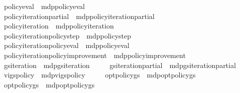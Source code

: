 \begin{isabellebody}
\ \ \ \ \ policy{\isacharunderscore}{\kern0pt}eval{\isacharprime}{\kern0pt}\ {\isacharequal}{\kern0pt}\ mdp{\isachardot}{\kern0pt}policy{\isacharunderscore}{\kern0pt}eval{\isacharprime}{\kern0pt}\isanewline
\ \ \ \ \ policy{\isacharunderscore}{\kern0pt}iteration{\isacharunderscore}{\kern0pt}partial{\isacharprime}{\kern0pt}\ {\isacharequal}{\kern0pt}\ mdp{\isachardot}{\kern0pt}policy{\isacharunderscore}{\kern0pt}iteration{\isacharunderscore}{\kern0pt}partial{\isacharprime}{\kern0pt}\isanewline
\ \ \ \ \ policy{\isacharunderscore}{\kern0pt}iteration{\isacharprime}{\kern0pt}\ {\isacharequal}{\kern0pt}\ mdp{\isachardot}{\kern0pt}policy{\isacharunderscore}{\kern0pt}iteration{\isacharprime}{\kern0pt}\isanewline
\ \ \ \ \ policy{\isacharunderscore}{\kern0pt}iteration{\isacharunderscore}{\kern0pt}policy{\isacharunderscore}{\kern0pt}step{\isacharprime}{\kern0pt}\ {\isacharequal}{\kern0pt}\ mdp{\isachardot}{\kern0pt}policy{\isacharunderscore}{\kern0pt}step{\isacharprime}{\kern0pt}\isanewline
\ \ \ \ \ policy{\isacharunderscore}{\kern0pt}iteration{\isacharunderscore}{\kern0pt}policy{\isacharunderscore}{\kern0pt}eval{\isacharprime}{\kern0pt}\ {\isacharequal}{\kern0pt}\ mdp{\isachardot}{\kern0pt}policy{\isacharunderscore}{\kern0pt}eval{\isacharprime}{\kern0pt}\isanewline
\ \ \ \ \ policy{\isacharunderscore}{\kern0pt}iteration{\isacharunderscore}{\kern0pt}policy{\isacharunderscore}{\kern0pt}improvement{\isacharprime}{\kern0pt}\ {\isacharequal}{\kern0pt}\ mdp{\isachardot}{\kern0pt}policy{\isacharunderscore}{\kern0pt}improvement{\isacharprime}{\kern0pt}\isanewline
\ \ \ \ \ gs{\isacharunderscore}{\kern0pt}iteration\ {\isacharequal}{\kern0pt}\ mdp{\isachardot}{\kern0pt}gs{\isacharunderscore}{\kern0pt}iteration\isanewline
\ \ \ \ \ gs{\isacharunderscore}{\kern0pt}iteration{\isacharunderscore}{\kern0pt}partial\ {\isacharequal}{\kern0pt}\ mdp{\isachardot}{\kern0pt}gs{\isacharunderscore}{\kern0pt}iteration{\isacharunderscore}{\kern0pt}partial\isanewline
\ \ \ \ \ vi{\isacharunderscore}{\kern0pt}gs{\isacharunderscore}{\kern0pt}policy\ {\isacharequal}{\kern0pt}\ mdp{\isachardot}{\kern0pt}vi{\isacharunderscore}{\kern0pt}gs{\isacharunderscore}{\kern0pt}policy\isanewline
\ \ \ \ \ opt{\isacharunderscore}{\kern0pt}policy{\isacharunderscore}{\kern0pt}gs\ {\isacharequal}{\kern0pt}\ mdp{\isachardot}{\kern0pt}opt{\isacharunderscore}{\kern0pt}policy{\isacharunderscore}{\kern0pt}gs\isanewline
\ \ \ \ \ opt{\isacharunderscore}{\kern0pt}policy{\isacharunderscore}{\kern0pt}gs{\isacharprime}{\kern0pt}{\isacharprime}{\kern0pt}\ {\isacharequal}{\kern0pt}\ mdp{\isachardot}{\kern0pt}opt{\isacharunderscore}{\kern0pt}policy{\isacharunderscore}{\kern0pt}gs{\isacharprime}{\kern0pt}{\isacharprime}{\kern0pt}\isanewline

\end{isabellebody}

